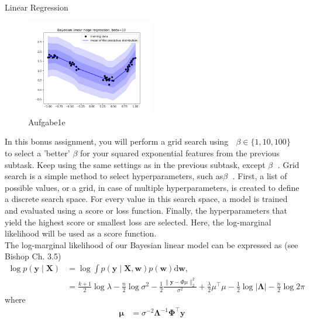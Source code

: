 \documentclass[
	ngerman,
     solution=true
	]{tudaexercise}
\begin{document}
\begin{task}{Linear Regression}
\begin{subtask}[1e)]
\begin{figure}[H] 
\centering 
\includegraphics[width=0.5\textwidth]{Aufgabe_1e.png} 
\caption{Aufgabe1e } 
\label{Fig.main3}
\end{figure}

\end{subtask}
\begin{subtask}[1f)]
In this bonus assignment, you will perform a grid search using  $\beta \in \{1,10,100\}$ to select a 'better' $\beta$ for your squared
exponential features from the previous subtask. Keep using the same settings as in the previous subtask, except $\beta$ .
Grid search is a simple method to select hyperparameters, such as$\beta$ . First, a list of possible values, or a grid, in case
of multiple hyperparameters, is created to define a discrete search space. For every value in this search space, a model
is trained and evaluated using a score or loss function. Finally, the hyperparameters that yield the highest score or
smallest loss are selected. Here, the log-marginal likelihood will be used as a score function.\\[15pt]
The log-marginal likelihood of our Bayesian linear model can be expressed as (see Bishop Ch. 3.5)
\[
\begin{aligned}
\log p(\mathbf{y} \mid \mathbf{X}) &=\log \int p(\mathbf{y} \mid \mathbf{X}, \mathbf{w}) p(\mathbf{w}) \mathrm{d} \mathbf{w},\\
&=\frac{k+1}{2} \log \lambda-\frac{n}{2} \log \sigma^{2}-\frac{1}{2} \frac{\|\mathbf{y}-\Phi \mu\|_{2}^{2}}{\sigma^{2}}+\frac{\lambda}{2} \mu^{\top} \mu-\frac{1}{2} \log |\mathbf{\Lambda}|-\frac{n}{2} \log 2 \pi
\end{aligned}
\]
where
\[
\begin{aligned}
\boldsymbol{\mu}&=\sigma^{-2} \boldsymbol{\Lambda}^{-1} \boldsymbol{\Phi}^{\top} \mathbf{y} \\

\end{aligned}\]
\end{subtask}
\end{task}
\end{document}
